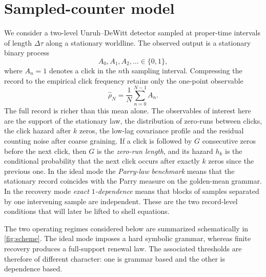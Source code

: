 \documentclass[11pt]{article}
\theoremstyle{definition}
\begin{document}
\section{Sampled-counter model}\label{sec:operational}

We consider a two-level Unruh--DeWitt detector sampled at proper-time intervals of length $\Delta\tau$ along a stationary worldline. The observed output is a stationary binary process
\[
A_0,A_1,A_2,\dots \in \{0,1\},
\]
where $A_n=1$ denotes a click in the $n$th sampling interval. Compressing the record to the empirical click frequency retains only the one-point observable
\[
\widehat\rho_N=\frac{1}{N}\sum_{n=0}^{N-1}A_n.
\]
The full record is richer than this mean alone. The observables of interest here are the support of the stationary law, the distribution of zero-runs between clicks, the click hazard after $k$ zeros, the low-lag covariance profile and the residual counting noise after coarse graining. If a click is followed by $G$ consecutive zeros before the next click, then $G$ is the \emph{zero-run length}, and its hazard $h_k$ is the conditional probability that the next click occurs after exactly $k$ zeros since the previous one. In the ideal mode the \emph{Parry-law benchmark} means that the stationary record coincides with the Parry measure on the golden-mean grammar. In the recovery mode \emph{exact $1$-dependence} means that blocks of samples separated by one intervening sample are independent. These are the two record-level conditions that will later be lifted to shell equations.

The two operating regimes considered below are summarized schematically in \cref{fig:scheme}. The ideal mode imposes a hard symbolic grammar, whereas finite recovery produces a full-support renewal law. The associated thresholds are therefore of different character: one is grammar based and the other is dependence based.
\end{document}
